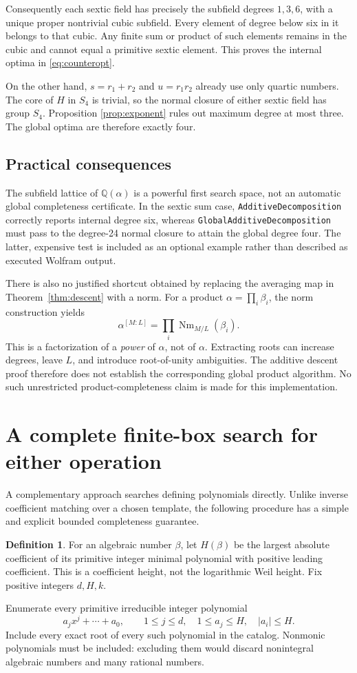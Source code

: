 \documentclass[11pt,letterpaper]{article}
\theoremstyle{definition}
\newtheorem{definition}[theorem]{Definition}
\theoremstyle{remark}
\newcommand{\Q}{\mathbb Q}
\newcommand{\Nm}{\operatorname{Nm}}
\newcommand{\wl}[1]{\texttt{#1}}
\begin{document}
Consequently each sextic field has precisely the subfield degrees
\(1,3,6\), with a unique proper nontrivial cubic subfield. Every element
of degree below six in it belongs to that cubic. Any finite sum or product
of such elements remains in the cubic and cannot equal a primitive sextic
element. This proves the internal optima in \eqref{eq:counteropt}.

On the other hand, \(s=r_1+r_2\) and \(u=r_1r_2\) already use only
quartic numbers. The core of \(H\) in \(S_4\) is trivial, so the normal
closure of either sextic field has group \(S_4\). Proposition
\ref{prop:exponent} rules out maximum degree at most three. The global
optima are therefore exactly four.

\subsection{Practical consequences}
The subfield lattice of \(\Q(\alpha)\) is a powerful first search space,
not an automatic global completeness certificate. In the sextic sum case,
\wl{AdditiveDecomposition} correctly reports internal degree six, whereas
\wl{GlobalAdditiveDecomposition} must pass to the degree-24 normal closure
to attain the global degree four. The latter, expensive test is included
as an optional example rather than described as executed Wolfram output.

There is also no justified shortcut obtained by replacing the averaging
map in Theorem~\ref{thm:descent} with a norm. For a product
\(\alpha=\prod_i\beta_i\), the norm construction yields
\[
 \alpha^{[M:L]}=\prod_i\Nm_{M/L}(\beta_i).
\]
This is a factorization of a \emph{power} of \(\alpha\), not of
\(\alpha\). Extracting roots can increase degrees, leave \(L\), and
introduce root-of-unity ambiguities. The additive descent proof therefore
does not establish the corresponding global product algorithm. No such
unrestricted product-completeness claim is made for this implementation.

\section{A complete finite-box search for either operation}
\label{sec:bounded}
A complementary approach searches defining polynomials directly. Unlike
inverse coefficient matching over a chosen template, the following
procedure has a simple and explicit bounded completeness guarantee.

\begin{definition}
For an algebraic number \(\beta\), let \(H(\beta)\) be the largest
absolute coefficient of its primitive integer minimal polynomial with
positive leading coefficient. This is a coefficient height, not the
logarithmic Weil height. Fix positive integers \(d,H,k\).
\end{definition}
Enumerate every primitive irreducible integer polynomial
\[
 a_jx^j+\cdots+a_0,\qquad
 1\leq j\leq d,\quad1\leq a_j\leq H,\quad |a_i|\leq H.
\]
Include every exact root of every such polynomial in the catalog.
Nonmonic polynomials must be included: excluding them would discard
nonintegral algebraic numbers and many rational numbers.
\end{document}
